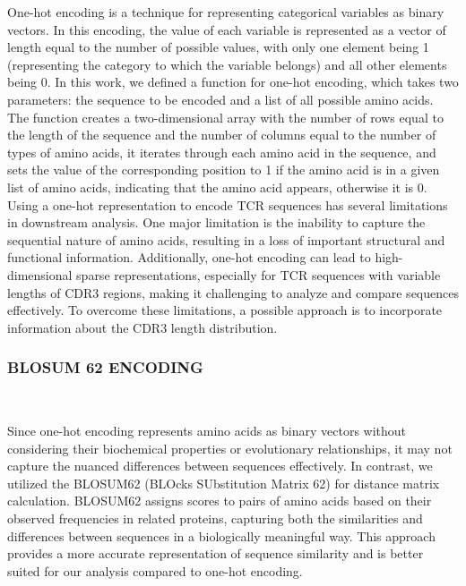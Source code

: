 \documentclass[conference]{IEEEtran}
\begin{document}
	One-hot encoding\cite{b2} is a technique for representing categorical variables as binary vectors. In this encoding, the value of each variable is represented as a vector of length equal to the number of possible values, with only one element being 1 (representing the category to which the variable belongs) and all other elements being 0. In this work, we defined a function for one-hot encoding, which takes two parameters: the sequence to be encoded and a list of all possible amino acids. The function creates a two-dimensional array with the number of rows equal to the length of the sequence and the number of columns equal to the number of types of amino acids, it iterates through each amino acid in the sequence, and sets the value of the corresponding position to 1 if the amino acid is in a given list of amino acids, indicating that the amino acid appears, otherwise it is 0.
    \\

    Using a one-hot representation to encode TCR sequences has several limitations in downstream analysis. One major limitation is the inability to capture the sequential nature of amino acids, resulting in a loss of important structural and functional information. Additionally, one-hot encoding can lead to high-dimensional sparse representations, especially for TCR sequences with variable lengths of CDR3 regions, making it challenging to analyze and compare sequences effectively. To overcome these limitations, a possible approach is to incorporate information about the CDR3 length distribution. 
    \\
	
	\subsubsection{BLOSUM 62 ENCODING} \

    Since one-hot encoding represents amino acids as binary vectors without considering their biochemical properties or evolutionary relationships, it may not capture the nuanced differences between sequences effectively. In contrast, we utilized the BLOSUM62 (BLOcks SUbstitution Matrix 62) for distance matrix calculation. BLOSUM62 assigns scores to pairs of amino acids based on their observed frequencies in related proteins, capturing both the similarities and differences between sequences in a biologically meaningful way. This approach provides a more accurate representation of sequence similarity and is better suited for our analysis compared to one-hot encoding.
    \\
    
\end{document}
